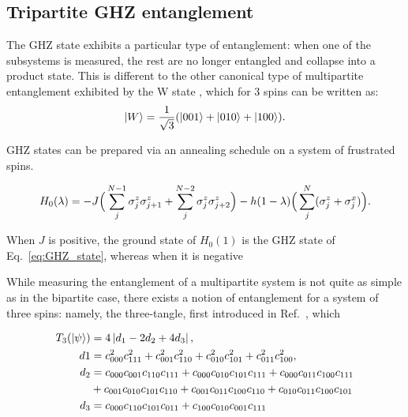 \subsection{Tripartite GHZ entanglement}

The GHZ state exhibits a particular type of entanglement: when one of the subsystems is measured, the rest are no longer entangled and collapse into a product state. This is different to the other canonical type of multipartite entanglement exhibited by the W state \cite{cabello_bells_2002}, which for 3 spins can be written as:
\begin{equation}\label{eq:W_state}
    \ket{W} = \frac{1}{\sqrt{3}}(\ket{001} + \ket{010} + \ket{100}).
\end{equation}


GHZ states can be prepared via an annealing schedule on a system of frustrated spins. 

\begin{equation}\label{eq:ghz_hamiltonian}
    H_0(\lambda) = - J \Big( \sum_{j}^{N-1} \sigma^z_j \sigma^z_{j+1} + \sum_{j}^{N-2} \sigma^z_j \sigma^z_{j+2} \Big) - h(1 - \lambda) \Big( \sum_j^N (\sigma^z_j + \sigma^x_j) \Big).
\end{equation}

When $J$ is positive, the ground state of $H_0(1)$ is the GHZ state of Eq.~\ref{eq:GHZ_state}, whereas when it is negative 

While measuring the entanglement of a multipartite system is not quite as simple as in the bipartite case, there exists a notion of entanglement for a system of three spins: namely, the three-tangle, first introduced in Ref.~\cite{coffman_distributed_2000}, which

\begin{equation}\label{eq:3-tangle}
	\begin{aligned}
		T_3(\ket{\psi}) &= 4 \left| d_1 - 2 d_2 + 4 d_3 \right|, \\
		d1 &= c^2_{000}c^2_{111} + c^2_{001}c^2_{110} + c^2_{010}c^2_{101} + c^2_{011}c^2_{100}, \\
		d_2 &= c_{000}c_{001}c_{110}c_{111} + c_{000}c_{010}c_{101}c_{111} + c_{000}c_{011}c_{100}c_{111} \\
		 &+ c_{001}c_{010}c_{101}c_{110} + c_{001}c_{011}c_{100}c_{110} + c_{010}c_{011}c_{100}c_{101} \\
		d_3 &= c_{000}c_{110}c_{101}c_{011} + c_{100}c_{010}c_{001}c_{111}
	\end{aligned}
\end{equation}

